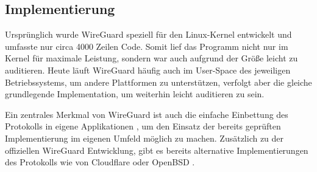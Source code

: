 \subsection{Implementierung}

Ursprünglich wurde WireGuard speziell für den Linux-Kernel entwickelt und umfasste nur circa 4000 Zeilen Code. Somit lief das Programm nicht nur im Kernel für maximale Leistung, sondern war auch aufgrund der Größe leicht zu auditieren. Heute läuft WireGuard häufig auch im User-Space des jeweiligen Betriebssystems, um andere Plattformen zu unterstützen, verfolgt aber die gleiche grundlegende Implementation, um weiterhin leicht auditieren zu sein. \cite{Wireguard_cross_platform}

Ein zentrales Merkmal von WireGuard ist auch die einfache Einbettung des Protokolls in eigene Applikationen \cite{Wireguard_Embedding}, um den Einsatz der bereits geprüften Implementierung im eigenen Umfeld möglich zu machen. Zusätzlich zu der offiziellen WireGuard Entwicklung, gibt es bereits alternative Implementierungen des Protokolls wie von Cloudflare \cite{CloudflareBoringTun} oder OpenBSD \cite{OpenBSD_WireGuard}.